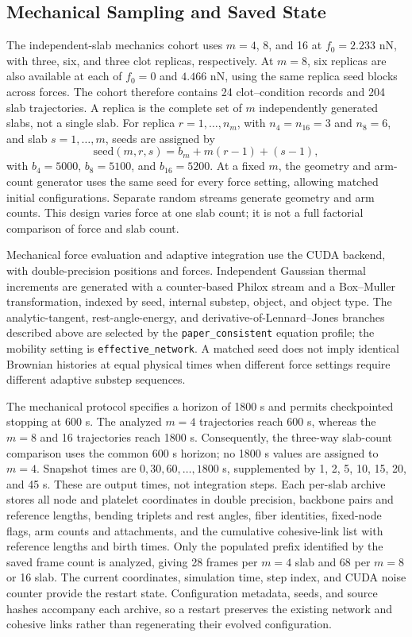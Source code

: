 \documentclass[twocolumn, 10pt]{article}
\begin{document}
\subsection{Mechanical Sampling and Saved State}
The independent-slab mechanics cohort uses $m=4$, 8, and 16 at $f_0=2.233$ nN, with three, six, and three clot replicas, respectively. At $m=8$, six replicas are also available at each of $f_0=0$ and $4.466$ nN, using the same replica seed blocks across forces. The cohort therefore contains 24 clot--condition records and 204 slab trajectories. A replica is the complete set of $m$ independently generated slabs, not a single slab. For replica $r=1,\ldots,n_m$, with $n_4=n_{16}=3$ and $n_8=6$, and slab $s=1,\ldots,m$, seeds are assigned by
\begin{equation}
\mathrm{seed}(m,r,s)=b_m+m(r-1)+(s-1),
\label{eq:mechanical-seeds}
\end{equation}
with $b_4=5000$, $b_8=5100$, and $b_{16}=5200$. At a fixed $m$, the geometry and arm-count generator uses the same seed for every force setting, allowing matched initial configurations. Separate random streams generate geometry and arm counts. This design varies force at one slab count; it is not a full factorial comparison of force and slab count.

Mechanical force evaluation and adaptive integration use the CUDA backend, with double-precision positions and forces. Independent Gaussian thermal increments are generated with a counter-based Philox stream and a Box--Muller transformation, indexed by seed, internal substep, object, and object type. The analytic-tangent, rest-angle-energy, and derivative-of-Lennard--Jones branches described above are selected by the \texttt{paper\_consistent} equation profile; the mobility setting is \texttt{effective\_network}. A matched seed does not imply identical Brownian histories at equal physical times when different force settings require different adaptive substep sequences.

The mechanical protocol specifies a horizon of 1800 s and permits checkpointed stopping at 600 s. The analyzed $m=4$ trajectories reach 600 s, whereas the $m=8$ and 16 trajectories reach 1800 s. Consequently, the three-way slab-count comparison uses the common 600 s horizon; no 1800 s values are assigned to $m=4$. Snapshot times are $0,30,60,\ldots,1800$ s, supplemented by 1, 2, 5, 10, 15, 20, and 45 s. These are output times, not integration steps. Each per-slab archive stores all node and platelet coordinates in double precision, backbone pairs and reference lengths, bending triplets and rest angles, fiber identities, fixed-node flags, arm counts and attachments, and the cumulative cohesive-link list with reference lengths and birth times. Only the populated prefix identified by the saved frame count is analyzed, giving 28 frames per $m=4$ slab and 68 per $m=8$ or 16 slab. The current coordinates, simulation time, step index, and CUDA noise counter provide the restart state. Configuration metadata, seeds, and source hashes accompany each archive, so a restart preserves the existing network and cohesive links rather than regenerating their evolved configuration.
\end{document}
